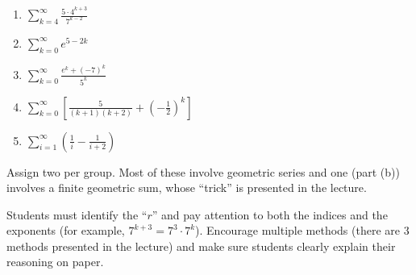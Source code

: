 \documentclass[]{ximera}
\begin{document}
\begin{problem}
\begin{enumerate}
\begin{freeResponse}
	\end{freeResponse}
	
	
	
	\item  $\sum_{k=4}^\infty \frac{5 \cdot 4^{k+3}}{7^{k-2}}$
	\begin{freeResponse}
	
	\end{freeResponse}
	
	
	
	\item  $\sum_{k=0}^\infty e^{5-2k}$
	\begin{freeResponse}
	
	\end{freeResponse}
	
	
	
	\item  $\sum_{k=0}^\infty \frac{e^k + (-7)^k}{5^k}$
	\begin{freeResponse}
	
	\end{freeResponse}
	
	
	
	\item  $ \sum_{k=0}^\infty \left[ \frac{5}{(k+1)(k+2)} + \left( - \frac{1}{2} \right)^k \right]$
	\begin{freeResponse}
	
	\end{freeResponse}
	
	
	
	\item  $\sum_{i=1}^\infty \left( \frac{1}{i} - \frac{1}{i+2} \right)$
	\begin{freeResponse}
	
	\end{freeResponse}
	
	\end{enumerate}
	
\end{problem}

\begin{instructorNotes}
Assign two per group.  
Most of these involve geometric series and one (part (b)) involves a finite geometric sum, whose ``trick'' is presented in the lecture.  

Students must identify the ``$r$'' and pay attention to both the indices and the exponents (for example, $7^{k+3} = 7^3 \cdot 7^k$).  
Encourage multiple methods (there are $3$ methods presented in the lecture) and make sure students clearly explain their reasoning on paper.  
\end{instructorNotes}
\end{document}

